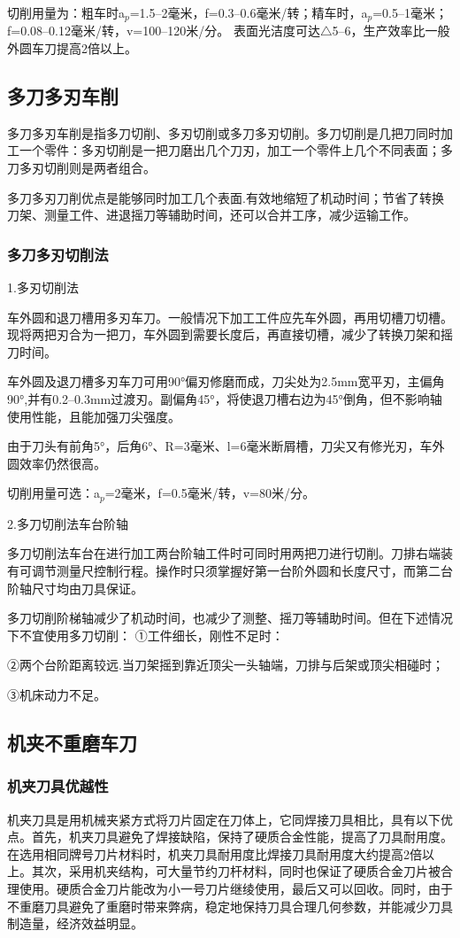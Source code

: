 \documentclass{ctexbook}
\begin{document}
切削用量为：粗车时a$_p$=1.5--2毫米，f=0.3--0.6毫米/转；精车时，a$_p$=0.5--1毫米；f=0.08--0.12毫米/转，v=100--120米/分。
表面光洁度可达$\bigtriangleup$5--6，生产效率比一般外圆车刀提高2倍以上。
\subsection{多刀多刃车削}
多刀多刃车削是指多刀切削、多刃切削或多刀多刃切削。多刀切削是几把刀同时加工一个零件：多刃切削是一把刀磨出几个刀刃，加工一个零件上几个不同表面；多刀多刃切削则是两者组合。

多刀多刃刀削优点是能够同时加工几个表面.有效地缩短了机动时间；节省了转换刀架、测量工件、进退摇刀等辅助时间，还可以合并工序，减少运输工作。
\subsubsection{多刀多刃切削法}	
1.多刃切削法

车外圆和退刀槽用多刃车刀。一般情况下加工工件应先车外圆，再用切槽刀切槽。现将两把刃合为一把刀，车外圆到需要长度后，再直接切槽，减少了转换刀架和摇刀时间。

车外圆及退刀槽多刃车刀可用90°偏刃修磨而成，刀尖处为2.5mm宽平刃，主偏角90°,并有0.2--0.3mm过渡刃。副偏角45°，将使退刀槽右边为45°倒角，但不影响轴使用性能，且能加强刀尖强度。

由于刀头有前角5°，后角6°、R=3毫米、l=6毫米断屑槽，刀尖又有修光刃，车外圆效率仍然很高。

切削用量可选：a$_p$=2毫米，f=0.5毫米/转，v=80米/分。

2.多刀切削法车台阶轴

多刀切削法车台在进行加工两台阶轴工件时可同时用两把刀进行切削。刀排右端装有可调节测量尺控制行程。操作时只须掌握好第一台阶外圆和长度尺寸，而第二台阶轴尺寸均由刀具保证。

多刀切削阶梯轴减少了机动时间，也减少了测整、摇刀等辅助时间。但在下述情况下不宜使用多刀切削：
①工件细长，刚性不足时：

②两个台阶距离较远.当刀架摇到靠近顶尖一头轴端，刀排与后架或顶尖相碰时；

③机床动力不足。
\subsection{机夹不重磨车刀}
\subsubsection{机夹刀具优越性}
机夹刀具是用机械夹紧方式将刀片固定在刀体上，它同焊接刀具相比，具有以下优点。首先，机夹刀具避免了焊接缺陷，保持了硬质合金性能，提高了刀具耐用度。在选用相同牌号刀片材料时，机夹刀具耐用度比焊接刀具耐用度大约提高2倍以上。其次，采用机夹结构，可大量节约刀杆材料，同时也保证了硬质合金刀片被合理使用。硬质合金刀片能改为小一号刀片继绫使用，最后又可以回收。同时，由于不重磨刀具避免了重磨时带来弊病，稳定地保持刀具合理几何参数，并能减少刀具制造量，经济效益明显。
\end{document}
